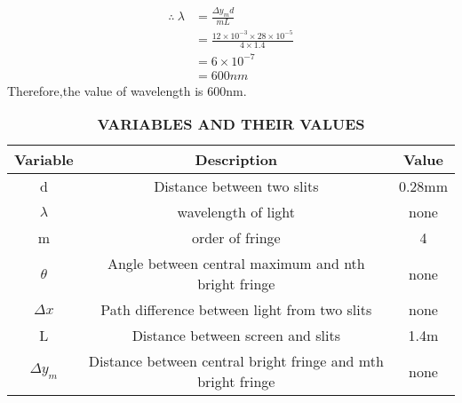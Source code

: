 \documentclass[journal,12pt,onecolumn]{IEEEtran}
\theoremstyle{remark}
\begin{document}
\[
\begin{aligned}
  \therefore\ \lambda&=\frac {\Delta y_m d}{mL}\\
&=\frac{12\times 10^{-3}\times28 \times 10^{-5}}{4\times1.4}\\
&=6\times 10^{-7}\\
&=600nm
\end{aligned}
\]
Therefore,the value of wavelength is 600nm.
\begin{table}
  \centering
  \begin{tabular}{|c|c|c|}
    \hline
      \textbf{Variable}& \textbf{Description}& \textbf{Value}\\\hline
    d& Distance between two slits& 0.28mm \\\hline
     $\lambda$ & wavelength of light & none \\\hline
    m & order of fringe&4\\\hline
   $ \theta $& Angle between central maximum and nth bright fringe & none\\\hline
    $\Delta x $& Path difference between light from two slits & none\\\hline
    L & Distance between screen and slits & 1.4m\\\hline
    $\Delta y_m $& Distance between central bright fringe and mth bright fringe & none\\ 
    \hline
  \end{tabular}
  \caption{\textbf{VARIABLES AND THEIR VALUES}}
  \label{tab:simple}
\end{table}
\end{document}

